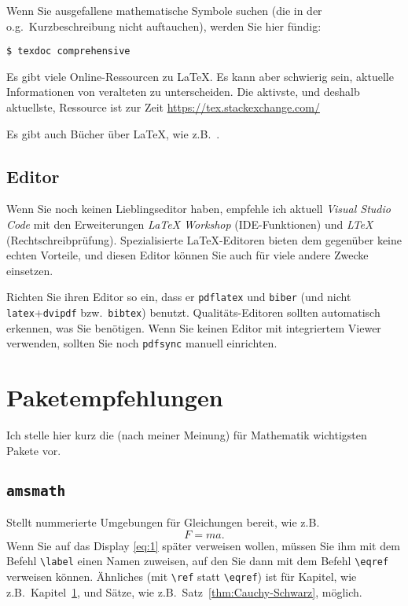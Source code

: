 \documentclass[11pt, a4paper, german]{article}
\theoremstyle{plain}
\theoremstyle{remark}
\theoremstyle{definition}
\numberwithin{equation}{section}
\numberwithin{theorem}{section}
\begin{document}
Wenn Sie ausgefallene mathematische Symbole suchen (die in der o.g.\ Kurzbeschreibung nicht auftauchen), werden Sie hier fündig:
\begin{verbatim}
$ texdoc comprehensive
\end{verbatim}
Es gibt viele Online-Ressourcen zu \LaTeX.
Es kann aber schwierig sein, aktuelle Informationen von veralteten zu unterscheiden.
Die aktivste, und deshalb aktuellste, Ressource ist zur Zeit \url{https://tex.stackexchange.com/}

Es gibt auch Bücher über \LaTeX, wie z.B.\ \cite{More_Math_into_Latex}.

\subsection{Editor}
Wenn Sie noch keinen Lieblingseditor haben, empfehle ich aktuell \emph{Visual Studio Code} mit den Erweiterungen \emph{LaTeX Workshop} (IDE-Funktionen) und \emph{LTeX} (Rechtschreibprüfung).
Spezialisierte \LaTeX-Editoren bieten dem gegenüber keine echten Vorteile, und diesen Editor können Sie auch für viele andere Zwecke einsetzen.

Richten Sie ihren Editor so ein, dass er \verb|pdflatex| und \verb|biber| (und nicht \verb|latex|+\verb|dvipdf| bzw.\ \verb|bibtex|) benutzt.
Qualitäts-Editoren sollten automatisch erkennen, was Sie benötigen.
Wenn Sie keinen Editor mit integriertem Viewer verwenden, sollten Sie noch \verb|pdfsync| manuell einrichten.

\clearpage
\section{Paketempfehlungen}
\label{sec:pakete}
Ich stelle hier kurz die (nach meiner Meinung) für Mathematik wichtigsten Pakete vor.

\subsection{\texttt{amsmath}}
Stellt nummerierte Umgebungen für Gleichungen bereit, wie z.B.
\begin{equation}
\label{eq:1}
F = ma.
\end{equation}
Wenn Sie auf das Display \eqref{eq:1} später verweisen wollen, müssen Sie ihm mit dem Befehl \verb|\label| einen Namen zuweisen, auf den Sie dann mit dem Befehl \verb|\eqref| verweisen können.
Ähnliches (mit \verb|\ref| statt \verb|\eqref|) ist für Kapitel, wie z.B.\ Kapitel~\ref{sec:pakete}, und Sätze, wie z.B.\ Satz~\ref{thm:Cauchy-Schwarz}, möglich.
\end{document}
